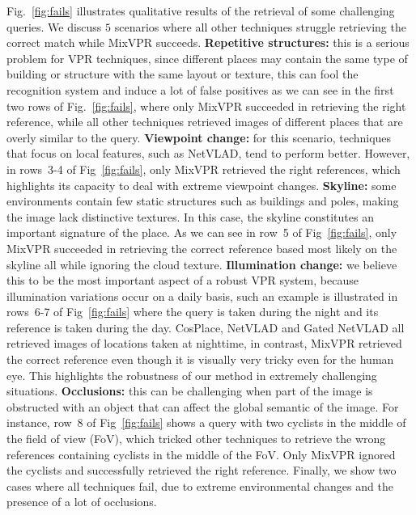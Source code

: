 \documentclass[10pt,twocolumn,letterpaper]{article}
\begin{document}
Fig.~\ref{fig:fails} illustrates qualitative results of the retrieval of some challenging queries. We discuss $5$ scenarios where all other techniques struggle retrieving the correct match while MixVPR succeeds. \textbf{Repetitive structures:} this is a serious problem for VPR techniques, since different places may contain the same type of building or structure with the same layout or texture, this can fool the recognition system and induce a lot of false positives as we can see in the first two rows of Fig.~\ref{fig:fails}, where only MixVPR succeeded in retrieving the right reference, while all other techniques retrieved images of different places that are overly similar to the query. \textbf{Viewpoint change:} for this scenario, techniques that focus on local features, such as NetVLAD, tend to perform better. However, in rows~3-4 of Fig~\ref{fig:fails}, only MixVPR retrieved the right references, which highlights its capacity to deal with extreme viewpoint changes. \textbf{Skyline:} some environments contain few static structures such as buildings and poles, making the image lack distinctive textures. In this case, the skyline constitutes an important signature of the place. As we can see in row~5 of Fig~\ref{fig:fails}, only MixVPR succeeded in retrieving the correct reference based most likely on the skyline all while ignoring the cloud texture. \textbf{Illumination change:} we believe this to be the most important aspect of a robust VPR system, because illumination variations occur on a daily basis, such an example is illustrated in rows~6-7 of Fig~\ref{fig:fails} where the query is taken during the night and its reference is taken during the day. CosPlace, NetVLAD and Gated NetVLAD all retrieved images of locations taken at nighttime, in contrast, MixVPR retrieved the correct reference even though it is visually very tricky even for the human eye. This highlights the robustness of our method in extremely challenging situations. \textbf{Occlusions:} this can be challenging when part of the image is obstructed with an object that can affect the global semantic of the image. For instance, row~8 of Fig~\ref{fig:fails} shows a query with two cyclists in the middle of the field of view (FoV), which tricked other techniques to retrieve the wrong references containing cyclists in the middle of the FoV. Only MixVPR ignored the cyclists and successfully retrieved the right reference. Finally, we show two cases where all techniques fail, due to extreme environmental changes and the presence of a lot of  occlusions.
\end{document}
